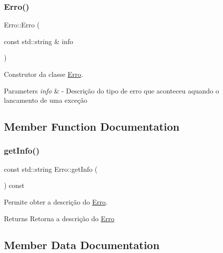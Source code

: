 \subsubsection{\texorpdfstring{Erro()}{Erro()}}
{\footnotesize\ttfamily Erro\+::\+Erro (\begin{DoxyParamCaption}\item[{const std\+::string \&}]{info }\end{DoxyParamCaption})\hspace{0.3cm}{\ttfamily [inline]}}



Construtor da classe \mbox{\hyperlink{class_erro}{Erro}}. 


\begin{DoxyParams}{Parameters}
{\em info} & -\/ Descrição do tipo de erro que aconteceu aquando o lancamento de uma exceção \\
\hline
\end{DoxyParams}


\subsection{Member Function Documentation}
\mbox{\label{class_erro_abfc1e9735b259d88bb97828a23164eb0}} 
\subsubsection{\texorpdfstring{get\+Info()}{getInfo()}}
{\footnotesize\ttfamily const std\+::string Erro\+::get\+Info (\begin{DoxyParamCaption}{ }\end{DoxyParamCaption}) const\hspace{0.3cm}{\ttfamily [inline]}}



Permite obter a descrição do \mbox{\hyperlink{class_erro}{Erro}}. 

\begin{DoxyReturn}{Returns}
Retorna a descrição do \mbox{\hyperlink{class_erro}{Erro}} 
\end{DoxyReturn}


\subsection{Member Data Documentation}
\mbox{\label{class_erro_a3ecaaf6f8e15a0830a648035b456cb62}} 
